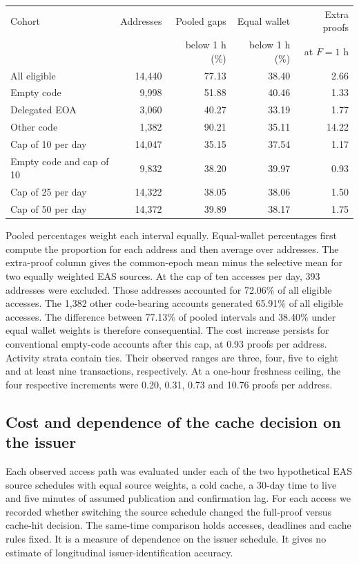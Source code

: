 \begin{center}
\small
\begin{tabular}{lrrrr}
\hline
Cohort & Addresses & Pooled gaps & Equal wallet & Extra proofs \\
 & & below 1 h (\%) & below 1 h (\%) & at $F=1$ h \\
\hline
All eligible & 14,440 & 77.13 & 38.40 & 2.66 \\
Empty code & 9,998 & 51.88 & 40.46 & 1.33 \\
Delegated EOA & 3,060 & 40.27 & 33.19 & 1.77 \\
Other code & 1,382 & 90.21 & 35.11 & 14.22 \\
Cap of 10 per day & 14,047 & 35.15 & 37.54 & 1.17 \\
Empty code and cap of 10 & 9,832 & 38.20 & 39.97 & 0.93 \\
Cap of 25 per day & 14,322 & 38.05 & 38.06 & 1.50 \\
Cap of 50 per day & 14,372 & 39.89 & 38.17 & 1.75 \\
\hline
\end{tabular}
\end{center}

Pooled percentages weight each interval equally. Equal-wallet percentages first compute the proportion for each address and then average over addresses. The extra-proof column gives the common-epoch mean minus the selective mean for two equally weighted EAS sources. At the cap of ten accesses per day, 393 addresses were excluded. Those addresses accounted for 72.06\% of all eligible accesses. The 1,382 other code-bearing accounts generated 65.91\% of all eligible accesses. The difference between 77.13\% of pooled intervals and 38.40\% under equal wallet weights is therefore consequential. The cost increase persists for conventional empty-code accounts after this cap, at 0.93 proofs per address. Activity strata contain ties. Their observed ranges are three, four, five to eight and at least nine transactions, respectively. At a one-hour freshness ceiling, the four respective increments were 0.20, 0.31, 0.73 and 10.76 proofs per address.

\subsection{Cost and dependence of the cache decision on the issuer}

Each observed access path was evaluated under each of the two hypothetical EAS source schedules with equal source weights, a cold cache, a 30-day time to live and five minutes of assumed publication and confirmation lag. For each access we recorded whether switching the source schedule changed the full-proof versus cache-hit decision. The same-time comparison holds accesses, deadlines and cache rules fixed. It is a measure of dependence on the issuer schedule. It gives no estimate of longitudinal issuer-identification accuracy.

